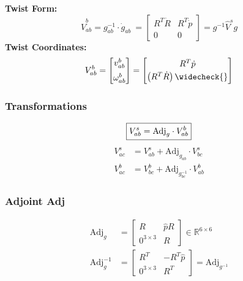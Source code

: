             \textbf{Twist Form:}
            $$
                \widehat{V}_{ab}^b = g_{ab}^{-1} \cdot \dot{g}_{ab}^{\phantom{-1}} = 
                    \begin{bmatrix}
                        R^T \dot{R} & R^T \dot{p}\\
                        0 & 0
                    \end{bmatrix}
                    =
                    g^{-1} \widehat{V}^s g
            $$
            \textbf{Twist Coordinates:}
            $$  
                V_{ab}^b = 
                    \begin{bmatrix}
                        v_{ab}^b \\[0.5em] \omega_{ab}^b
                    \end{bmatrix}
                    =
                    \begin{bmatrix}
                        R^T \dot{p}\\[0.25em] \left( R^T \dot{R} \right) \widecheck{}
                    \end{bmatrix}
            $$
    \vfill \null \columnbreak
    \subsubsection{Transformations}
        \vspace{-1em}
        $$\boxed{%
            V_{ab}^s = \textrm{Adj}_g \cdot V_{ab}^b
        }$$
        \begin{align*}
            V_{ac}^s &= V_{ab}^s + \textrm{Adj}_{g_{ab}} \cdot V_{bc}^s\\
            V_{ac}^b &=  V_{bc}^b + \textrm{Adj}_{g_{bc}^{-1}} \cdot V_{ab}^b
        \end{align*}
    \subsubsection{Adjoint \texorpdfstring{\hfill Adj}{}}
        \vspace{-0.5em}
        \begin{align*}
            \textrm{Adj}_g &=
                \begin{bmatrix}
                    R & \widehat{p}R\\
                    0^{3 \times 3} & R
                \end{bmatrix} \in \mathbb{R}^{6 \times 6}
            \\[0.25em]
            \textrm{Adj}_g^{-1} &=
                \begin{bmatrix}
                    R^T & -R^T \widehat{p}\\
                    0^{3 \times 3} & R^T
                \end{bmatrix}
                =
                \textrm{Adj}_{g^{-1}}
        \end{align*}